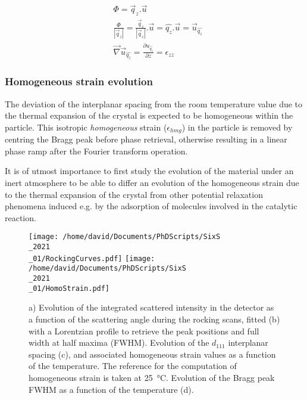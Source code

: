 {\begin{align}
    \label{eq:StrainFromPhase1}
    & \Phi =  \vec{q}_z.\vec{u} \\
    \label{eq:StrainFromPhase2}
    & \frac{\Phi}{|\vec{q}_z|} = \frac{\vec{q}_z}{|\vec{q}_z|}.\vec{u} = \hat{q_z}.\vec{u} = \vec{u}_{\hat{q_z}} \\
    \label{eq:StrainFromPhase3}
    & \vec{\nabla} \vec{u}_{\hat{q_z}} = \frac{\partial u_{\hat{q_z}}}{\partial z} = \epsilon_{zz}
\end{align}

\subsubsection{Homogeneous strain evolution}

The deviation of the interplanar spacing from the room temperature value due to the thermal expansion of the crystal is expected to be homogeneous within the particle.
This isotropic \textit{homogeneous} strain ($\epsilon_{hmg}$) in the particle is removed by centring the Bragg peak before phase retrieval, otherwise resulting in a linear phase ramp after the Fourier transform operation.

It is of utmost importance to first study the evolution of the material under an inert atmosphere to be able to differ an evolution of the homogeneous strain due to the thermal expansion of the crystal from other potential relaxation phenomena induced e.g. by the adsorption of molecules involved in the catalytic reaction.


\begin{figure}[!htb]
    \centering
    \texttt{[image: /home/david/Documents/PhDScripts/SixS\\\_2021\\\_01/RockingCurves.pdf]}
    \texttt{[image: /home/david/Documents/PhDScripts/SixS\\\_2021\\\_01/HomoStrain.pdf]}
    \caption{
        a) Evolution of the integrated scattered intensity in the detector as a function of the scattering angle during the rocking scans, fitted (b) with a Lorentzian profile to retrieve the peak positions and full width at half maxima (FWHM).
        Evolution of the $d_{111}$ interplanar spacing (c), and associated homogeneous strain values as a function of the temperature.
        The reference for the computation of homogeneous strain is taken at \qty{25}{\degreeCelsius}.
        Evolution of the Bragg peak FWHM as a function of the temperature (d).
    }
    \label{fig:HomoStrain}
\end{figure}

}
